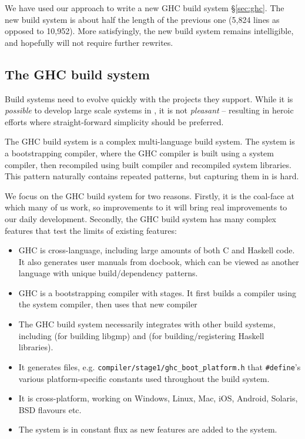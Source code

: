 We have used our approach to write a new GHC build system \S\ref{sec:ghc}. The new build system is about half the length of the previous one (5,824 lines as opposed to 10,952).  More satisfyingly, the new build system remains intelligible, and hopefully will not require further rewrites.

\subsection{The GHC build system}


Build systems need to evolve quickly with the projects they support. While it is \textit{possible} to develop large scale systems in \make, it is not \textit{pleasant} -- resulting in heroic efforts where straight-forward simplicity should be preferred.

The GHC build system is a complex multi-language build system. The system is a bootstrapping compiler, where the GHC compiler is built using a system compiler, then recompiled using built compiler and recompiled system libraries. This pattern naturally contains repeated patterns, but capturing them in \make{} is hard.

We focus on the GHC build system for two reasons. Firstly, it is the coal-face at which many of us work, so improvements to it will bring real improvements to our daily development. Secondly, the GHC build system has many complex features that test the limits of existing features:

\begin{itemize}
\item GHC is cross-language, including large amounts of both C and Haskell code. It also generates user manuals from docbook, which can be viewed as another language with unique build/dependency patterns.
\item GHC is a bootstrapping compiler with stages. It first builds a compiler using the system compiler, then uses that new compiler
\item The GHC build system necessarily integrates with other build systems, including \make{} (for building libgmp) and \cabal{} (for building/registering Haskell libraries).
\item It generates files, e.g. \texttt{compiler/stage1/ghc\_boot\_platform.h}
that \texttt{\#define}'s various platform-specific constants used throughout the
build system.
\item It is cross-platform, working on Windows, Linux, Mac, iOS, Android, Solaris, BSD flavours etc.
\item The system is in constant flux as new features are added to the system.
\end{itemize}

